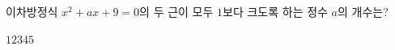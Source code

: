 \hspace*{2mm}\begin{minipage}[t]{\dimexpr\linewidth-2mm\relax}\vspace{0pt}
이차방정식 $x^2+ax+9=0$의 두 근이 모두 $1$보다 크도록 하는 정수 $a$의 개수는?
\begin{choices32}{$1$}{$2$}{$3$}{$4$}{$5$}\end{choices32}\end{minipage}
